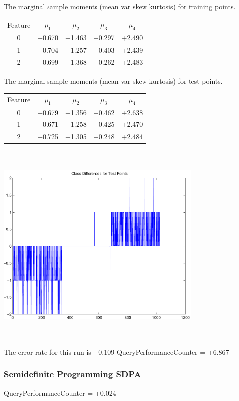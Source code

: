 \documentclass[9pt]{article}
\theoremstyle{plain}
\theoremstyle{definition}
\theoremstyle{remark}
\numberwithin{equation}{section}
\begin{document}
The marginal sample moments (mean var skew kurtosis) for training points.\newline
\begin{tabular}{ c |  c  c  c  c}
Feature & $\mu_1$ & $\mu_2$ & $\mu_3$ & $\mu_4$ \\
0 & +0.670 & +1.463 & +0.297& +2.490 \\
\hline
1 & +0.704 & +1.257 & +0.403& +2.439 \\
\hline
2 & +0.699 & +1.368 & +0.262& +2.483 \\
\hline
\end{tabular}
\newline
The marginal sample moments (mean var skew kurtosis) for test points.\newline
\begin{tabular}{ c | c  c  c  c}
Feature & $\mu_1$ & $\mu_2$ & $\mu_3$ & $\mu_4$ \\
0 & +0.679 & +1.356 & +0.462& +2.638\\
\hline
1 & +0.671 & +1.258 & +0.425& +2.470\\
\hline
2 & +0.725 & +1.305 & +0.248& +2.484\\
\hline
\end{tabular}\newline
\includegraphics[width=10.0cm,height=10.0cm]{classDiffs.pdf}

The error rate for this run is +0.109\newline
QueryPerformanceCounter  =  +6.867
\subsubsection{Semidefinite Programming SDPA}
QueryPerformanceCounter  =  +0.024
\end{document}
